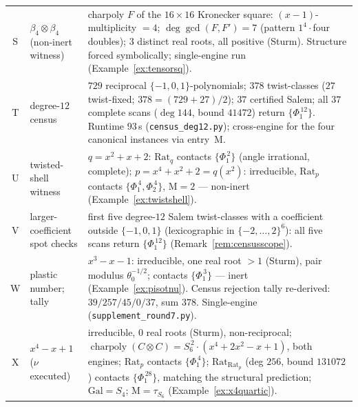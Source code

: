 \documentclass[11pt]{article}
\theoremstyle{plain}
\theoremstyle{definition}
\theoremstyle{remark}
\newcommand{\Mah}{\mathrm{M}}
\newcommand{\Rat}{\mathrm{Rat}}
\begin{document}
\begin{center}
\begin{tabular}{clp{9.2cm}}
S & $\beta_4\otimes\beta_4$ (non-inert witness) & charpoly $F$ of the
$16\times16$ Kronecker square: $(x-1)$-multiplicity $=4$;
$\deg\gcd(F,F')=7$ (pattern $1^4\cdot$four doubles); $3$ distinct real
roots, all positive (Sturm). Structure forced symbolically; single-engine
run (Example~\ref{ex:tensorsq}).\\[2pt]
T & degree-$12$ census & $729$ reciprocal $\{-1,0,1\}$-polynomials; $378$
twist-classes ($27$ twist-fixed; $378=(729+27)/2$); $37$ certified Salem;
all $37$ complete scans ($\deg144$, bound $41472$) return
$\{\Phi_1^{\,12}\}$. Runtime $93$\,s (\texttt{census\_deg12.py});
cross-engine for the four canonical instances via entry~M.\\[2pt]
U & twisted-shell witness & $q=x^2+x+2$: $\Rat_q$ contacts
$\{\Phi_1^{\,2}\}$ (angle irrational, complete); $p=x^4+x^2+2=q(x^2)$:
irreducible, $\Rat_p$ contacts $\{\Phi_1^{\,4},\Phi_2^{\,4}\}$,
$\Mah=2$ --- non-inert (Example~\ref{ex:twistshell}).\\[2pt]
V & larger-coefficient spot checks & first five degree-$12$ Salem
twist-classes with a coefficient outside $\{-1,0,1\}$ (lexicographic in
$\{-2,\dots,2\}^6$): all five scans return $\{\Phi_1^{\,12}\}$
(Remark~\ref{rem:censusscope}).\\[2pt]
W & plastic number; tally & $x^3-x-1$: irreducible, one real root $>1$
(Sturm), pair modulus $\theta_0^{-1/2}$; contacts $\{\Phi_1^{\,3}\}$ ---
inert (Example~\ref{ex:pisotnu}). Census rejection tally re-derived:
$39/257/45/0/37$, sum $378$. Single-engine
(\texttt{supplement\_round7.py}).\\[2pt]
X & $x^4-x+1$ ($\nu$ executed) & irreducible, $0$ real roots (Sturm),
non-reciprocal; $\operatorname{charpoly}(C\otimes C)
=S_6^{\,2}\cdot(x^4+2x^2-x+1)$, both engines; $\Rat_p$ contacts
$\{\Phi_1^{\,4}\}$; $\Rat_{\Rat_p}$ (deg $256$, bound $131072$) contacts
$\{\Phi_1^{\,28}\}$, matching the structural prediction;
$\mathrm{Gal}=S_4$; $\Mah=\tau_{S_6}$ (Example~\ref{ex:x4quartic}).\\
\hline
\end{tabular}
\end{center}
\end{document}
